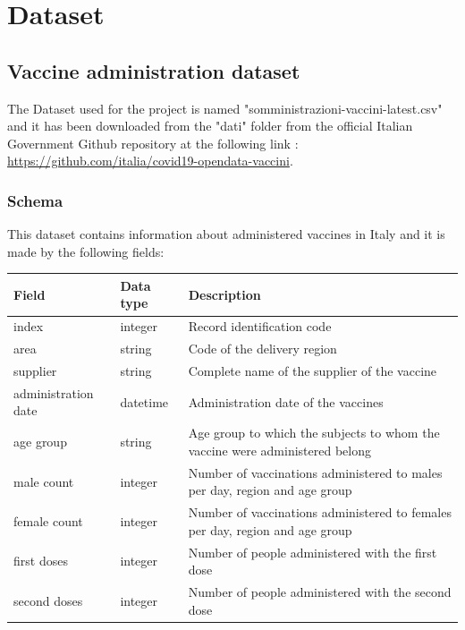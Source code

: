 \documentclass{article}
\begin{document}
\hfill\break
\newpage

\newpage
\section{Dataset}
\subsection{Vaccine administration dataset}
The Dataset used for the project is named {\selectfont"somministrazioni-vaccini-latest.csv"} and it has been downloaded from the {\selectfont"dati"} folder from the official Italian Government Github repository at the following link :\\ \url{https://github.com/italia/covid19-opendata-vaccini}.
\subsubsection{Schema}
This dataset contains information about administered vaccines in Italy and it is made by the following fields:
\hfill\break
\begin{center}
\begin{tabular}{ |m{4cm}|m{2cm}|m{4.5cm}|}
  \hline
  \bfseries{Field} & \bfseries{Data type} & \bfseries{Description} \\
  \hline\hline
  index & integer & Record identification code\\
  \hline
  area & string & Code of the delivery region\\
    \hline
      supplier & string & Complete name of the supplier of the vaccine\\
    \hline
          administration date & datetime & Administration date of the vaccines\\
              \hline
          age group & string & Age group to which the subjects to whom the vaccine were administered belong\\
                        \hline
          male count & integer & Number of vaccinations administered to males per day, region and age group\\
                        \hline
          female count & integer & Number of vaccinations administered to females per day, region and age group\\
    \hline
  first doses & integer & Number of people administered with the first dose\\ 
    \hline
  second doses & integer & Number of people administered with the second dose\\
    \hline

\end{tabular}
\end{center}
\end{document}

